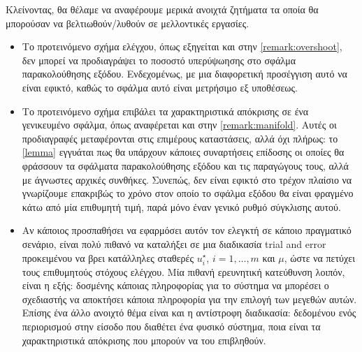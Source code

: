 Κλείνοντας, θα θέλαμε να αναφέρουμε μερικά ανοιχτά ζητήματα τα οποία θα μπορούσαν να βελτιωθούν/λυθούν σε μελλοντικές εργασίες.
\begin{itemize}
    \item Το προτεινόμενο σχήμα ελέγχου, όπως εξηγείται και στην \cref{remark:overshoot}, δεν μπορεί να προδιαγράψει το ποσοστό υπερύψωησης στο σφάλμα παρακολούθησης εξόδου. Ενδεχομένως, με μια διαφορετική προσέγγιση αυτό να είναι εφικτό, καθώς το σφάλμα αυτό είναι μετρήσιμο εξ υποθέσεως.
    \item Το προτεινόμενο σχήμα επιβάλει τα χαρακτηριστικά απόκρισης σε ένα γενικευμένο σφάλμα, όπως αναφέρεται και στην \cref{remark:manifold}. Αυτές οι προδιαγραφές μεταφέρονται στις επιμέρους καταστάσεις, αλλά όχι πλήρως: το \cref{lemma} εγγυάται πως θα υπάρχουν κάποιες συναρτήσεις επίδοσης οι οποίες θα φράσσουν τα σφάλματα παρακολούθησης εξόδου και τις παραγώγους τους, αλλά με άγνωστες αρχικές συνθήκες. Συνεπώς, δεν είναι εφικτό στο τρέχον πλαίσιο να γνωρίζουμε επακριβώς το χρόνο στον οποίο το σφάλμα εξόδου θα είναι φραγμένο κάτω από μία επιθυμητή τιμή, παρά μόνο έναν γενικό ρυθμό σύγκλισης αυτού.
    \item Αν κάποιος προσπαθήσει να εφαρμόσει αυτόν τον ελεγκτή σε κάποιο πραγματικό σενάριο, είναι πολύ πιθανό να καταλήξει σε μια διαδικασία \textlatin{trial and error} προκειμένου να βρει κατάλληλες σταθερές $u_i^\star$, $i = 1,\ldots,m$ και $\mu$, ώστε να πετύχει τους επιθυμητούς στόχους ελέγχου. Μία πιθανή ερευνητική κατεύθυνση λοιπόν, είναι η εξής: δοσμένης κάποιας πληροφορίας για το σύστημα να μπορέσει ο σχεδιαστής να αποκτήσει κάποια πληροφορία για την επιλογή των μεγεθών αυτών. Επίσης ένα άλλο ανοιχτό θέμα είναι και η αντίστροφη διαδικασία: δεδομένου ενός περιορισμού στην είσοδο που διαθέτει ένα φυσικό σύστημα, ποια είναι τα χαρακτηριστικά απόκρισης που μπορούν να του επιβληθούν.
\end{itemize}